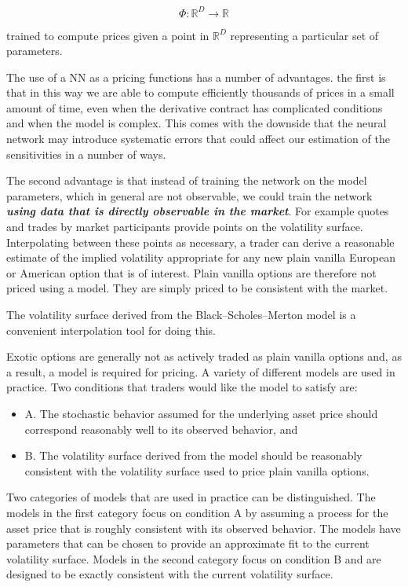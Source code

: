 \documentclass[11pt]{article}
\begin{document}
\[
\Phi : \mathbb{R}^D \rightarrow \mathbb{R}
\]

trained to compute prices given a point in $\mathbb{R}^D$
representing a particular set of parameters.

The use of a NN as a pricing functions has a number of advantages. the
first is that in this way we are able to compute efficiently thousands
of prices in a small amount of time, even when the derivative contract
has complicated conditions and when the model is complex. This comes
with the downside that the neural network may introduce systematic
errors that could affect our estimation of the sensitivities in a number
of ways.

The second advantage is that instead of training the network on the
model parameters, which in general are not observable, we could train
the network \textbf{\emph{using data that is directly observable in the
market}}. For example quotes and trades by market participants provide
points on the volatility surface. Interpolating between these points as
necessary, a trader can derive a reasonable estimate of the implied
volatility appropriate for any new plain vanilla European or American
option that is of interest. Plain vanilla options are therefore not
priced using a model. They are simply priced to be consistent with the
market.

The volatility surface derived from the Black--Scholes--Merton model is
a convenient interpolation tool for doing this.

Exotic options are generally not as actively traded as plain vanilla
options and, as a result, a model is required for pricing. A variety of
different models are used in practice. Two conditions that traders would
like the model to satisfy are:

\begin{itemize}
\item
  A. The stochastic behavior assumed for the underlying asset price
  should correspond reasonably well to its observed behavior, and
\item
  B. The volatility surface derived from the model should be reasonably
  consistent with the volatility surface used to price plain vanilla
  options.
\end{itemize}

Two categories of models that are used in practice can be distinguished.
The models in the first category focus on condition A by assuming a
process for the asset price that is roughly consistent with its observed
behavior. The models have parameters that can be chosen to provide an
approximate fit to the current volatility surface. Models in the second
category focus on condition B and are designed to be exactly consistent
with the current volatility surface.
\end{document}
